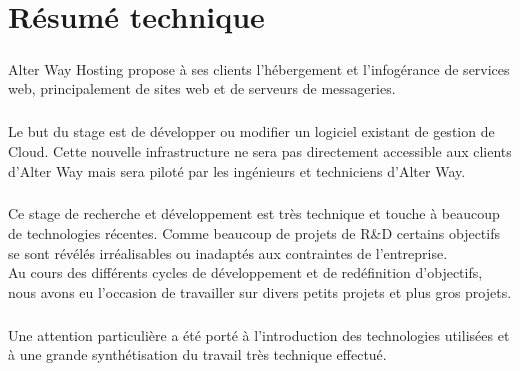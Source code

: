 \chapter*{Résumé technique}
\paragraph*{}
	Alter Way Hosting propose à ses clients l'hébergement et l'infogérance de
	services web, principalement de sites web et de serveurs de messageries.

\paragraph*{}
	Le but du stage est de développer ou modifier un logiciel existant de gestion
	de Cloud. Cette nouvelle infrastructure ne sera pas directement accessible
	aux clients d'Alter Way mais sera piloté par les ingénieurs et techniciens
	d'Alter Way.

\paragraph*{}
	Ce stage de recherche et développement est très technique et touche à beaucoup de technologies récentes.
	Comme beaucoup de projets de R\&D certains objectifs se sont révélés irréalisables ou inadaptés aux contraintes
	de l'entreprise.\\
	Au cours des différents cycles de développement et de redéfinition d'objectifs, nous avons eu l'occasion de travailler
	sur divers petits projets et plus gros projets.

\paragraph*{}
	Une attention particulière a été porté à l'introduction des technologies utilisées et à une grande synthétisation du
	travail très technique effectué.

